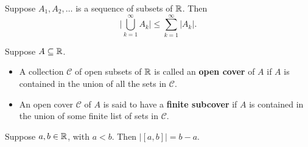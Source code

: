 \documentclass[a4paper]{article}
\begin{document}
\begin{prop}
   Suppose \( {A}_{1}, {A}_{2}, \dots \) is a sequence of subsets of \( \mathbb{R}  \). Then 
   \[  \Big| \bigcup_{ k=1  }^{ \infty  }  {A}_{k} \Big|  \leq \sum_{ k=1  }^{ \infty   } | {A}_{k} |. \]
\end{prop}

\begin{definition}
    Suppose \( A \subseteq  \mathbb{R}  \).
    \begin{itemize}
        \item A collection \( \mathcal{C} \) of open subsets of \( \mathbb{R}  \) is called an \textbf{open cover} of \( A  \) if \( A  \) is contained in the union of all the sets in \( \mathcal{C} \).
        \item An open cover \( \mathcal{C} \) of \( A  \) is said to have a \textbf{finite subcover} if \( A  \) is contained in the union of some finite list of sets in \( \mathcal{C} \).
    \end{itemize}
\end{definition}

\begin{prop}
    Suppose \( a,b \in \mathbb{R}  \), with \( a < b  \). Then \( | [a,b] |  = b - a  \). 
\end{prop}
\end{document}
